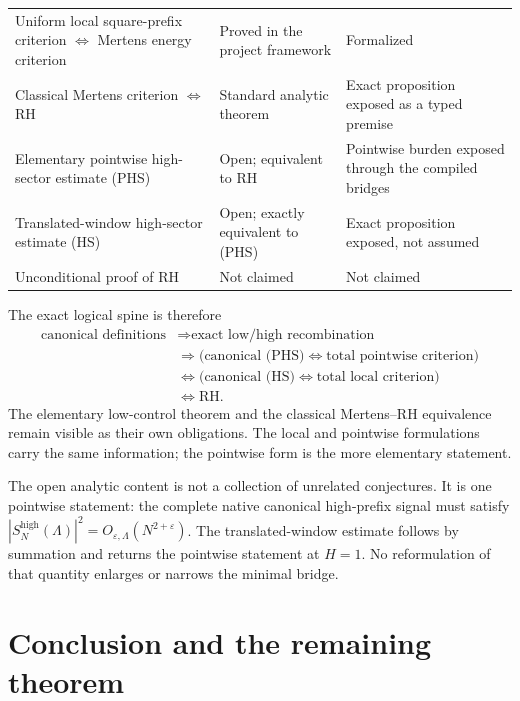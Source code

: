 \documentclass[11pt]{article}
\theoremstyle{definition}
\theoremstyle{remark}
\newcommand{\eps}{\varepsilon}
\newcommand{\1}{\mathbf{1}}
\begin{document}
\begin{table}[htbp]
\begin{tabular}{>{\raggedright\arraybackslash}p{}
                >{\raggedright\arraybackslash}p{}
                >{\raggedright\arraybackslash}p{}}
Uniform local square-prefix criterion $\Longleftrightarrow$ Mertens energy criterion
& Proved in the project framework
& Formalized\\
Classical Mertens criterion $\Longleftrightarrow$ RH
& Standard analytic theorem
& Exact proposition exposed as a typed premise\\
Elementary pointwise high-sector estimate (PHS)
& Open; equivalent to RH
& Pointwise burden exposed through the compiled bridges\\
Translated-window high-sector estimate (HS)
& Open; exactly equivalent to (PHS)
& Exact proposition exposed, not assumed\\
Unconditional proof of RH
& Not claimed
& Not claimed\\
\bottomrule
\end{tabular}
\end{table}

The exact logical spine is therefore
\[
 \begin{aligned}
 \text{canonical definitions}
 &\Longrightarrow \text{exact low/high recombination}\\
 &\Longrightarrow
 \bigl(\text{canonical (PHS)}\Longleftrightarrow
       \text{total pointwise criterion}\bigr)\\
 &\Longleftrightarrow
 \bigl(\text{canonical (HS)}\Longleftrightarrow
       \text{total local criterion}\bigr)\\
 &\Longleftrightarrow \mathrm{RH}.
 \end{aligned}
\]
The elementary low-control theorem and the classical Mertens--RH equivalence remain visible as their own obligations.  The local and pointwise formulations carry the same information; the pointwise form is the more elementary statement.

The open analytic content is not a collection of unrelated conjectures.  It is one pointwise statement: the complete native canonical high-prefix signal must satisfy $|S_N^{\mathrm{high}}(\Lambda)|^2=O_{\eps,\Lambda}(N^{2+\eps})$.  The translated-window estimate follows by summation and returns the pointwise statement at $H=1$.  No reformulation of that quantity enlarges or narrows the minimal bridge.

\section{Conclusion and the remaining theorem}
\label{sec:conclusion}
\end{document}
